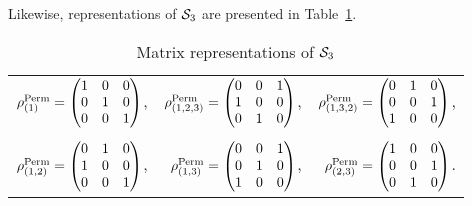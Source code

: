 	\begin{example}\label{ex:permS3}
		Likewise, representations of $\mathcal{S}_3$ are presented in Table~\ref{table:permS3}.
		\begin{table}[hbt!]
			\centering
			\begin{tabular}{r r r}
				$\rho_{(1)}^{\text{Perm}} = 
				\begin{pmatrix}
					1 & 0 & 0 \\
					0 & 1 & 0 \\
					0 & 0 & 1
				\end{pmatrix}$, & 
				$\rho_{(1,2,3)}^{\text{Perm}} = 
				\begin{pmatrix}
					0 & 0 & 1 \\
					1 & 0 & 0 \\
					0 & 1 & 0
				\end{pmatrix}$, & 
				$\rho_{(1,3,2)}^{\text{Perm}} = 
				\begin{pmatrix}
					0 & 1 & 0 \\
					0 & 0 & 1 \\
					1 & 0 & 0
				\end{pmatrix}$, \\ & & \\
				$\rho_{(1,2)}^{\text{Perm}} = 
				\begin{pmatrix}
					0 & 1 & 0 \\
					1 & 0 & 0 \\
					0 & 0 & 1
				\end{pmatrix}$, &
				$\rho_{(1,3)}^{\text{Perm}} = 
				\begin{pmatrix}
					0 & 0 & 1 \\
					0 & 1 & 0 \\
					1 & 0 & 0
				\end{pmatrix}$, &
				$\rho_{(2,3)}^{\text{Perm}} = 
				\begin{pmatrix}
					1 & 0 & 0 \\
					0 & 0 & 1 \\
					0 & 1 & 0
				\end{pmatrix}$.
			\end{tabular}
			\caption{Matrix representations of $\mathcal{S}_3$}
			\label{table:permS3}
		\end{table}
	\end{example}
	
